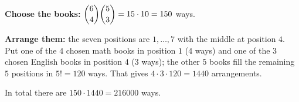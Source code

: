 \textbf{Choose the books:} $\dbinom64\dbinom53=15\cdot10=150$ ways.

\textbf{Arrange them:} the seven positions are $1,\dots,7$ with the middle at position $4$. Put one of the $4$ chosen math books in position $1$ ($4$ ways) and one of the $3$ chosen English books in position $4$ ($3$ ways); the other $5$ books fill the remaining $5$ positions in $5!=120$ ways. That gives $4\cdot3\cdot120=1440$ arrangements.

In total there are $150\cdot1440=\boxed{216000}$ ways.
